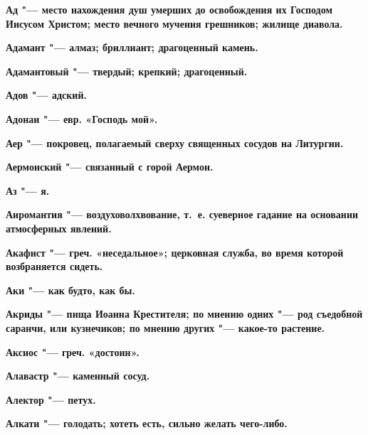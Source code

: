 \begin{mymulticols}{2}
\bfseries Ад\normalfont{} "--- место нахождения душ умерших до освобождения их Господом Иисусом Христом; место вечного мучения грешников; жилище диавола. 




\bfseries Адамант\normalfont{} "--- алмаз; бриллиант; драгоценный камень. 




\bfseries Адамантовый\normalfont{} "--- твердый; крепкий; драгоценный. 




\bfseries Адов\normalfont{} "--- адский. 




\bfseries Адонаи\normalfont{} "--- евр. «Господь мой». 




\bfseries Аер\normalfont{} "--- покровец, полагаемый сверху священных сосудов на Литургии. 




\bfseries Аермонский\normalfont{} "--- связанный с горой Аермон. 




\bfseries Аз\normalfont{} "--- я. 




\bfseries Аиромантия\normalfont{} "--- воздуховолхвование, т.~е. суеверное гадание на основании атмосферных явлений. 




\bfseries Акафист\normalfont{} "--- греч. «неседальное»; церковная служба, во время которой возбраняется сидеть. 




\bfseries Аки\normalfont{} "--- как будто, как бы. 




\bfseries Акриды\normalfont{} "--- пища Иоанна Крестителя; по мнению одних "--- род съедобной саранчи, или кузнечиков; по мнению других "--- какое-то растение. 




\bfseries Аксиос\normalfont{} "--- греч. «достоин». 




\bfseries Алавастр\normalfont{} "--- каменный сосуд. 




\bfseries Алектор\normalfont{} "--- петух. 




\bfseries Алкати\normalfont{} "--- голодать; хотеть есть, сильно желать чего-либо. 





\end{mymulticols}
